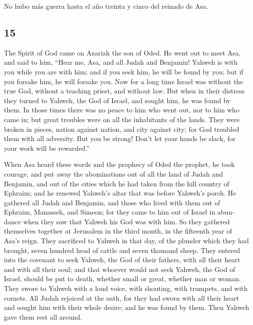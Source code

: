 \begin{paracol}{2}
 No hubo más guerra hasta el año treinta y cinco del
reinado de Asa.

\switchcolumn
\begin{otherlanguage}{english}

\hypertarget{section-29}{%
\section{15}\label{section-29}}

 The Spirit of God came on Azariah the son of Oded.
 He went out to meet Asa, and said to him, ``Hear me, Asa,
and all Judah and Benjamin! Yahweh is with you while you are with him;
and if you seek him, he will be found by you; but if you forsake him, he
will forsake you.  Now for a long time Israel was without
the true God, without a teaching priest, and without law. 
But when in their distress they turned to Yahweh, the God of Israel, and
sought him, he was found by them.  In those times there
was no peace to him who went out, nor to him who came in; but great
troubles were on all the inhabitants of the lands.  They
were broken in pieces, nation against nation, and city against city; for
God troubled them with all adversity.  But you be strong!
Don't let your hands be slack, for your work will be rewarded.''

 When Asa heard these words and the prophecy of Oded the
prophet, he took courage, and put away the abominations out of all the
land of Judah and Benjamin, and out of the cities which he had taken
from the hill country of Ephraim; and he renewed Yahweh's altar that was
before Yahweh's porch.  He gathered all Judah and
Benjamin, and those who lived with them out of Ephraim, Manasseh, and
Simeon; for they came to him out of Israel in abundance when they saw
that Yahweh his God was with him.  So they gathered
themselves together at Jerusalem in the third month, in the fifteenth
year of Asa's reign.  They sacrificed to Yahweh in that
day, of the plunder which they had brought, seven hundred head of cattle
and seven thousand sheep.  They entered into the covenant
to seek Yahweh, the God of their fathers, with all their heart and with
all their soul;  and that whoever would not seek Yahweh,
the God of Israel, should be put to death, whether small or great,
whether man or woman.  They swore to Yahweh with a loud
voice, with shouting, with trumpets, and with cornets. 
All Judah rejoiced at the oath, for they had sworn with all their heart
and sought him with their whole desire; and he was found by them. Then
Yahweh gave them rest all around.


\end{otherlanguage}
\end{paracol}
